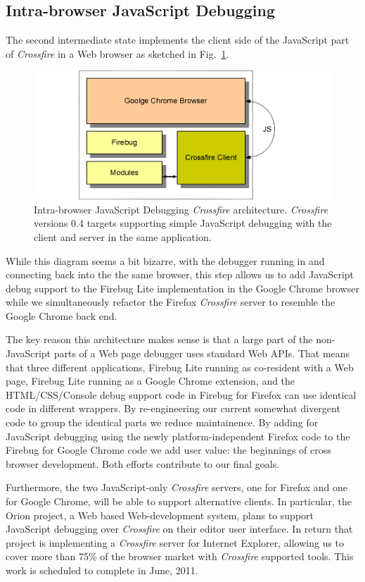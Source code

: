 \subsection{Intra-browser JavaScript Debugging}
The second intermediate state implements the client side of the JavaScript part
of \textit{Crossfire} in a Web browser as sketched in Fig.~\ref{fig:fbugChrome}.
\begin{figure}[htp]
  \includegraphics  [width = 86 mm] {figures/fbugChrome.png}
  \caption{Intra-browser JavaScript Debugging \textit{Crossfire} architecture.
\textit{Crossfire} versions 0.4 targets supporting simple JavaScript debugging with the client and server in the same application.}
 \label{fig:fbugChrome}
\end{figure}
While this diagram seems a bit bizarre, with the debugger running in and
connecting back into the the same browser, this step allows us to add JavaScript
debug support to the Firebug Lite implementation in the Google Chrome browser
while we simultaneously refactor the Firefox  \textit{Crossfire} server to
resemble the Google Chrome back end.


The key reason this architecture makes sense is that a large part of the
non-JavaScript parts of a Web page debugger uses standard Web APIs. That  means
that three different applications, Firebug Lite running as co-resident with a
Web page, Firebug Lite running as a Google Chrome extension,  and the
HTML/CSS/Console debug support code in Firebug for Firefox can use identical
code in different wrappers. By re-engineering our current somewhat divergent
code to group the identical parts we reduce maintainence. By adding for
JavaScript debugging using the newly platform-independent Firefox code to the
Firebug for Google Chrome code we add user value: the beginnings of cross
browser development. Both efforts contribute to our final goals.


Furthermore, the two JavaScript-only \textit{Crossfire} servers, one for Firefox
and one for Google Chrome, will be able to support alternative clients. In
particular, the Orion project, a Web based Web-development system, plans to
support JavaScript debugging over \textit{Crossfire} on their editor user
interface. In return that project is implementing a \textit{Crossfire} server
for Internet Explorer, allowing us to cover more than 75\% of the browser market
with \textit{Crossfire} supported tools. This work is scheduled to complete in
June, 2011.


